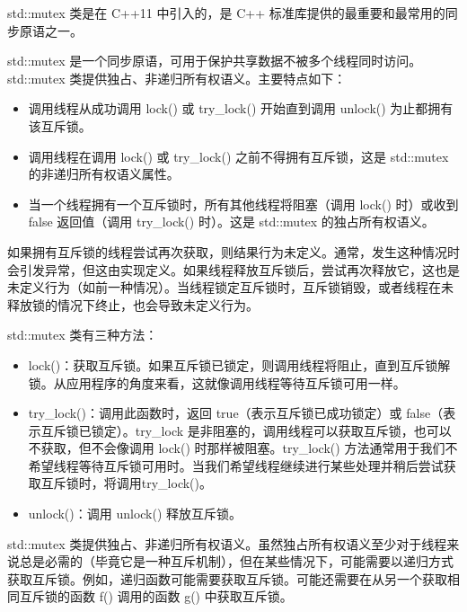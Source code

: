 
std::mutex 类是在 C++11 中引入的，是 C++ 标准库提供的最重要和最常用的同步原语之一。

std::mutex 是一个同步原语，可用于保护共享数据不被多个线程同时访问。std::mutex 类提供独占、非递归所有权语义。主要特点如下：

\begin{itemize}
\item
调用线程从成功调用 lock() 或 try\_lock() 开始直到调用 unlock() 为止都拥有该互斥锁。

\item
调用线程在调用 lock() 或 try\_lock() 之前不得拥有互斥锁，这是 std::mutex 的非递归所有权语义属性。

\item
当一个线程拥有一个互斥锁时，所有其他线程将阻塞（调用 lock() 时）或收到 false 返回值（调用 try\_lock() 时）。这是 std::mutex 的独占所有权语义。
\end{itemize}

如果拥有互斥锁的线程尝试再次获取，则结果行为未定义。通常，发生这种情况时会引发异常，但这由实现定义。如果线程释放互斥锁后，尝试再次释放它，这也是未定义行为（如前一种情况）。当线程锁定互斥锁时，互斥锁销毁，或者线程在未释放锁的情况下终止，也会导致未定义行为。

std::mutex 类有三种方法：

\begin{itemize}
\item
lock()：获取互斥锁。如果互斥锁已锁定，则调用线程将阻止，直到互斥锁解锁。从应用程序的角度来看，这就像调用线程等待互斥锁可用一样。

\item
try\_lock()：调用此函数时，返回 true（表示互斥锁已成功锁定）或 false（表示互斥锁已锁定）。try\_lock 是非阻塞的，调用线程可以获取互斥锁，也可以不获取，但不会像调用 lock() 时那样被阻塞。try\_lock() 方法通常用于我们不希望线程等待互斥锁可用时。当我们希望线程继续进行某些处理并稍后尝试获取互斥锁时，将调用try\_lock()。

\item
unlock()：调用 unlock() 释放互斥锁。
\end{itemize}


std::mutex 类提供独占、非递归所有权语义。虽然独占所有权语义至少对于线程来说总是必需的（毕竟它是一种互斥机制），但在某些情况下，可能需要以递归方式获取互斥锁。例如，递归函数可能需要获取互斥锁。可能还需要在从另一个获取相同互斥锁的函数 f() 调用的函数 g() 中获取互斥锁。

